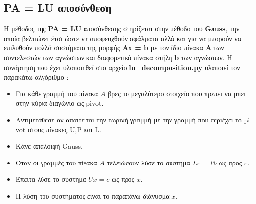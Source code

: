 \documentclass[First Project.tex]{subfiles}
\begin{document}
\subsection{\textlatin{\textbf{PA = LU}} αποσύνθεση}

Η μέθοδος της \textlatin{\textbf{PA = LU}} αποσύνθεσης στηρίζεται στην μέθοδο του \textlatin{\textbf{Gauss}}, την οποία βελτιώνει έτσι ώστε να αποφευχθούν 
σφάλματα αλλά και για να μπορούν να επιλυθούν πολλά συστήματα της μορφής \textlatin{\textbf{Ax = b}} με τον ίδιο πίνακα \textlatin{\textbf{A}} των 
συντελεστών των αγνώστων και διαφορετικό πίνακα στήλη \textlatin{\textbf{b}} των αγνώστων. Η συνάρτηση που έχει υλοποιηθεί στο αρχείο 
\textlatin{\textbf{lu\_decomposition.py}} υλοποιεί τον παρακάτω αλγόριθμο :
\begin{itemize}
    \item Για κάθε γραμμή του πίνακα $Α$ βρες το μεγαλύτερο στοιχείο που πρέπει να μπει στην κύρια διαγώνιο ως \textlatin{pivot}.
    \item Αντιμετάθεσε αν απαιτείται την τωρινή γραμμή με την γραμμή που περιέχει το \textlatin{pivot} στους πίνακες \textlatin{U,P} και \textlatin{L}.
    \item Κάνε απαλοιφή \textlatin{Gauss}.
    \item Όταν οι γραμμές του πίνακα $Α$ τελειώσουν λύσε το σύστημα $Lc = Pb$ ως προς $c$.
    \item Έπειτα λύσε το σύστημα $Ux = c$ ως προς $x$.
    \item Η λύση του συστήματος είναι το παραπάνω διάνυσμα $x$.
\end{itemize}
\end{document}
